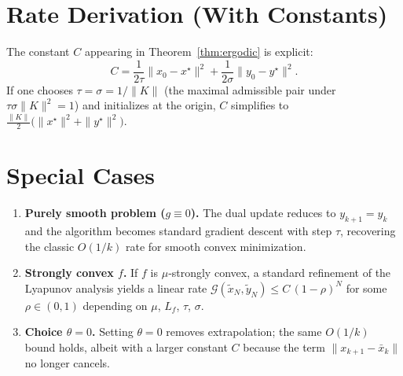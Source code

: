 \documentclass{article}
\begin{document}
\section*{Rate Derivation (With Constants)}
The constant $C$ appearing in Theorem~\ref{thm:ergodic} is explicit:
\[
C=
\frac{1}{2\tau}\|x_{0}-x^{\star}\|^{2}
+\frac{1}{2\sigma}\|y_{0}-y^{\star}\|^{2}.
\]
If one chooses $\tau=\sigma=1/\|K\|$ (the maximal admissible pair
under $\tau\sigma\|K\|^{2}=1$) and initializes at the origin,
$C$ simplifies to $\frac{\|K\|}{2}\bigl(\|x^{\star}\|^{2}+\|y^{\star}\|^{2}\bigr)$.

\section*{Special Cases}
\begin{enumerate}[label=\alph*)]
\item \textbf{Purely smooth problem ($g\equiv0$).}
   The dual update reduces to $y_{k+1}=y_{k}$ and the algorithm
   becomes standard gradient descent with step $\tau$, recovering the
   classic $O(1/k)$ rate for smooth convex minimization.
\item \textbf{Strongly convex $f$.}
   If $f$ is $\mu$‑strongly convex, a standard refinement of the
   Lyapunov analysis yields a linear rate
   $\mathcal G(\tilde x_{N},\tilde y_{N})\le C\,(1-\rho)^{N}$
   for some $\rho\in(0,1)$ depending on $\mu$, $L_f$, $\tau$, $\sigma$.
\item \textbf{Choice $\theta=0$.}
   Setting $\theta=0$ removes extrapolation; the same $O(1/k)$ bound
   holds, albeit with a larger constant $C$ because the term
   $\|x_{k+1}-\bar x_k\|$ no longer cancels.
\end{enumerate}
\end{document}
